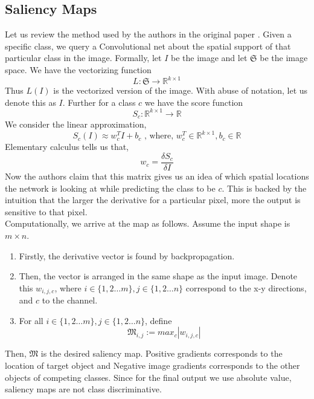 \subsection{Saliency Maps}

Let us review the method used by the authors in the original paper \cite{saliency}. Given a specific class, we query a Convolutional net about the spatial support of that particular class in the image. Formally, let $I$ be the image and let $\mathfrak{S}$ be the image space. We have the vectorizing function
\[L: \mathfrak{S} \to \mathbb{R}^{k\times1}\]
Thus $L(I)$ is the vectorized version of the image. With abuse of notation, let us denote this as $I$. Further for a class $c$ we have the score function
\[S_c: \mathbb{R}^{k\times1} \to \mathbb{R}\]
We consider the linear approximation,
\[S_c(I) \approx w_c^TI + b_c \text{ , where, } w_c^T \in \mathbb{R}^{k\times1}, b_c \in \mathbb{R}\]
Elementary calculus tells us that,
\[w_c = \frac{\delta S_c}{\delta I}\]
Now the authors claim that this matrix gives us an idea of which spatial locations the network is looking at while predicting the class to be $c$. This is backed by the intuition that the larger the derivative for a particular pixel, more the output is sensitive to that pixel. \\ 
Computationally, we arrive at the map as follows. Assume the input shape is $m \times n$. \begin{enumerate}
\item Firstly, the derivative vector is found by backpropagation.
\item Then, the vector is arranged in the same shape as the input image. Denote this $w_{i,j,c}$, where $i \in \{1,2 \dots m\}, j \in \{1,2 \dots n\}$ correspond to the x-y directions, and $c$ to the channel.
\item For all $i \in \{1,2 \dots m\}, j \in \{1,2 \dots n\}$, define $$\mathfrak{M}_{i,j} := max_c|w_{i,j,c}|$$
\end{enumerate}
Then, $\mathfrak{M}$ is the desired saliency map. 
Positive gradients corresponds to the location of target object and Negative image gradients corresponds to the other objects of competing classes. 
Since for the final output we use absolute value, saliency maps are not class discriminative.   
